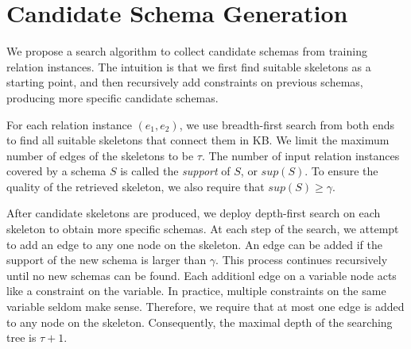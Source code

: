 \section{Candidate Schema Generation}
\label{sec:candgen}

We propose a search algorithm to collect 
candidate schemas from training relation instances.
The intuition is that we first find suitable skeletons 
as a starting point, and then recursively add constraints on 
previous schemas, producing more specific candidate schemas.

For each relation instance $(e_1, e_2)$, 
we use breadth-first search from both ends 
to find all suitable skeletons that connect them in KB.
We limit the maximum number of edges of the skeletons to be $\tau$.
The number of input relation instances
covered by a schema $S$ is called the {\em support} of $S$, or
$sup(S)$.
To ensure the quality of the retrieved skeleton, we also
require that $sup(S) \ge \gamma$. 


After candidate skeletons are produced, we deploy depth-first search on
each skeleton to obtain more specific schemas.
At each step of the search, we attempt to add an edge to any one node
on the skeleton. An edge can be added if the support of the 
new schema is larger than $\gamma$. 
This process continues recursively until
no new schemas can be found.
Each additionl edge on a variable node acts like a constraint on the variable.
In practice, multiple constraints on the same variable seldom make sense. 
Therefore, we require that at most one edge is added to any node 
on the skeleton.
Consequently, the maximal depth of the searching tree is $\tau+1$.

